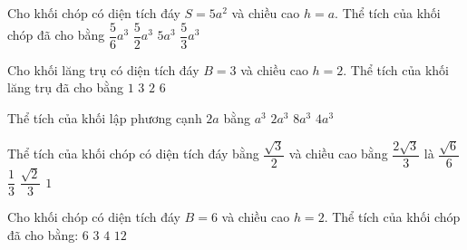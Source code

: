 

\begin{ex}%
	Cho khối chóp có diện tích đáy $S=5a^2$ và  chiều cao $h=a$. Thể tích của khối chóp đã cho bằng
	 \choice
		 {$\dfrac{5}{6}{a^3}$}
		 {$\dfrac{5}{2}{a^3}$}
		 {$ 5a^3$}
		{\True  $\dfrac{5}{3}{a^3}$}
\end{ex}

\begin{ex}%
	Cho khối lăng  trụ có diện tích đáy $B=3$ và chiều cao $h=2$. Thể tích của khối lăng trụ đã cho bằng
	\choice 
		{$1$} 
		 {$3$}
		{$2$} 
		{\True  $6$}
\end{ex}

\begin{ex}%
	Thể tích của khối lập phương cạnh $2a$ bằng 
	\choice 
		 {$a^3$}
		{$2a^3$} 
		{\True  $8a^3$}
		 {$4a^3$}
\end{ex}

\begin{ex}%
	Thể tích của khối chóp có  diện tích đáy bằng $\dfrac{\sqrt{3}}{2}$ và chiều cao bằng $\dfrac{2\sqrt{3}}{3}$ là
	 \choice
		{$\dfrac{\sqrt{6}}{6}$} 
		 {\True $\dfrac{1}{3}$}
		{$\dfrac{\sqrt{2}}{3}$} 
		 {$1$}
\end{ex}

\begin{ex}%
	Cho khối chóp có diện tích đáy $B=6$ và chiều cao $h=2$. Thể tích của khối chóp đã cho  bằng:
	\choice 
		 {$6$}
		 {$3$}
		{\True $4$} 
		{$12$} 
\end{ex}

